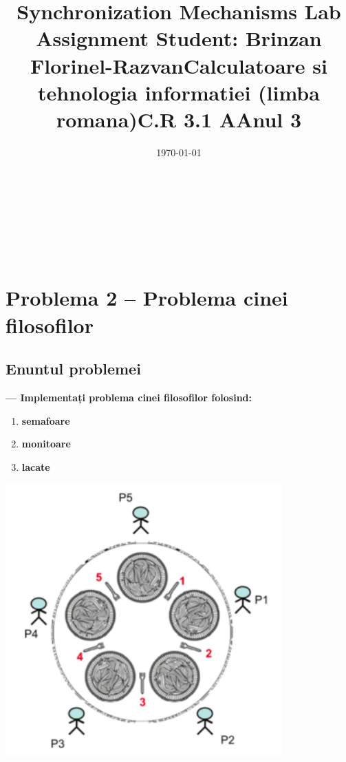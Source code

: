 \documentclass[14pt]{article}
\begin{document}
\title{\huge \textbf{Synchronization Mechanisms Lab Assignment} }
\date{\today}
\maketitle
\begin{center}
\vspace{30 mm}

\title{\huge \textbf{Student: Brinzan Florinel-Razvan}}
\\\vspace{10 mm}
\title{\huge Calculatoare si tehnologia informatiei (limba romana)}
\\\vspace{10 mm}
\title{\huge \textbf{C.R 3.1 A}}
\\\vspace{10 mm}
\title{\huge \textbf{Anul 3}}
\date{}
\maketitle

\newpage
\end{center}

\section{Problema 2 -- Problema cinei filosofilor}

\vspace{4 mm}

\subsection{Enuntul problemei}

\vspace{2 mm}


\textbf{--- Implementați problema cinei filosofilor folosind:}

\begin{enumerate}
\item \textbf{semafoare}
\item \textbf{monitoare }
\item \textbf{lacate}
\end{enumerate}

\begin{center}\includegraphics[height=3 in, width = 3 in]{filosofi.png}
\end{center}
\end{document}
